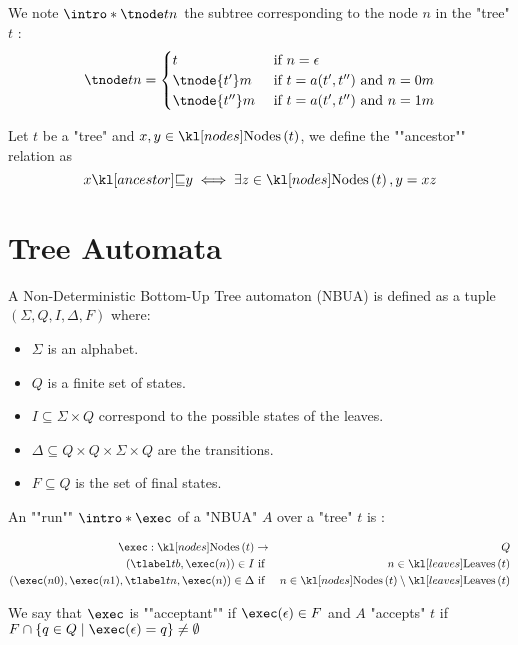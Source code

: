 \documentclass{article}
\begin{document}
\begin{definition}
	We note $\intro* \tnode t n$ the subtree corresponding to the node $n$ in the "tree" $t$ :
	\[
		\tnode t n =   \begin{cases}
			t              & \text{ if }  n = \epsilon                     \\
			\tnode {t'} m  & \text{ if } t = a(t',t'') \text{ and } n = 0m \\
			\tnode {t''} m & \text{ if } t = a(t',t'') \text{ and } n = 1m
		\end{cases}
	\]
\end{definition}

\begin{definition}
	Let $t$ be a "tree" and $x, y \in \nodes t$, we define the ""ancestor"" relation as
	\[ \ancestor x y \iff \exists z \in \nodes t, y = xz \]
\end{definition}



\section{Tree Automata}

\begin{definition}
	A Non-Deterministic Bottom-Up Tree automaton (NBUA) is defined as a tuple
	$(\Sigma, Q, I, \Delta, F)$ where:
	\begin{itemize}
		\item $\Sigma$ is an alphabet.
		\item $Q$ is a finite set of states.
		\item $I \subseteq \Sigma \times Q$ correspond to the possible states of the leaves.
		\item $\Delta \subseteq Q \times Q \times \Sigma \times Q$ are the transitions.
		\item $F \subseteq Q$ is the set of final states.
	\end{itemize}
\end{definition}

\begin{definition}
	An ""run"" $\intro* \exec$ of a "NBUA" $A$ over a "tree" $t$ is :

	\begin{eqnarray*}
		\exec : \nodes t &\to& Q \\
		(\tlabel t b,  \exec (n) ) \in I &\text{ if }& n \in \leaves t \\
		(\exec (n0), \exec (n1), \tlabel t n, \exec (n)) \in \Delta &\text{ if }& n \in \nodes t \setminus \leaves t
	\end{eqnarray*}

	We say that $\exec$ is ""acceptant"" if $\exec (\epsilon) \in F$ and $A$ "accepts" $t$ if
	$F \cap \setdef { q\in Q} {\exec (\epsilon) = q} \neq \emptyset$
\end{definition}
\end{document}
